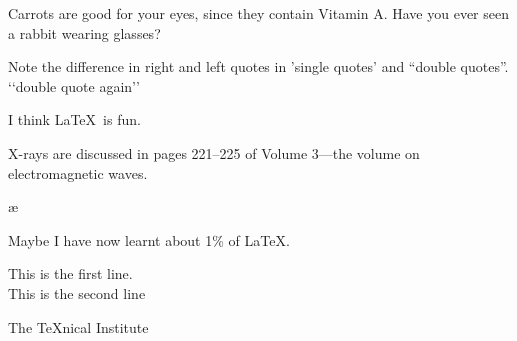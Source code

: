 \documentclass[10pt]{book}
\begin{document}
Carrots are good for your eyes, since they contain Vitamin A\@. Have
you ever seen a rabbit wearing glasses?


Note the difference in right and left quotes in 'single quotes'
and ``double quotes''. \lq\lq double quote again\rq\rq

I think \LaTeX\ is fun.

X-rays are discussed in pages 221--225 of Volume 3---the volume on
electromagnetic waves.

\ae  

Maybe I have now learnt about 1\% of \LaTeX.

This is the first line.\\[10pt]
This is the second line



\begin{center}
The \TeX nical Institute
\end{center}
\end{document}

